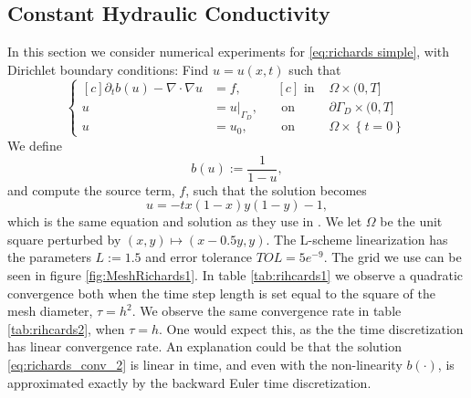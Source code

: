 \documentclass[../Main/main.tex]{subfiles}
\begin{document}
	\subsection{Constant Hydraulic Conductivity}
	In this section we consider numerical experiments for \eqref{eq:richards simple}, with Dirichlet boundary conditions: Find $u=u(x,t)$ such that
	\begin{equation}\label{eq:richards_conv_1}
			\left \{
		\begin{aligned}[c]
			\partial_t b(u) - \nabla \cdot \nabla u &= f, \\
			u &= u|_{\Gamma_D}, \\
			u &= u_0,
		\end{aligned}
		\ \ \
		\begin{aligned}[c]
			\text{ in }& \Omega \times (0,T]\\
			\text{ on }& \partial \Gamma_D \times (0,T]\\
			\text{ on }& \Omega \times \left\{t=0\right \}
		\end{aligned}
		\right.
	\end{equation}
	We define 
	\begin{equation}\label{eq:richards_conv_2}
		b(u):=\frac{1}{1-u},
	\end{equation}
	and compute the source term, $f$, such that the solution becomes
	\begin{equation}\label{eq:richards_conv_3}
		u = -tx(1-x)y(1-y)-1,
	\end{equation}
	which is the same equation and solution as they use in \cite{RaduWang}.
	We let $\Omega$ be the unit square perturbed by $(x,y)  \mapsto (x-0.5y,y)$.
	The L-scheme linearization has the parameters $L:=1.5$ and error tolerance $TOL=5e^{-9}$. The grid we use can be seen in figure \eqref{fig:MeshRichards1}. In table \ref{tab:rihcards1} we observe a quadratic convergence both when the time step length is set equal to the square of the mesh diameter, $\tau=h^2$. We observe the same convergence rate in table \ref{tab:rihcards2}, when $\tau=h$. One would expect this, as the the time discretization has linear convergence rate. An explanation could be that the solution \eqref{eq:richards_conv_2} is linear in time, and even with the non-linearity $b(\cdot)$, is approximated exactly by the backward Euler time discretization.
\end{document}
